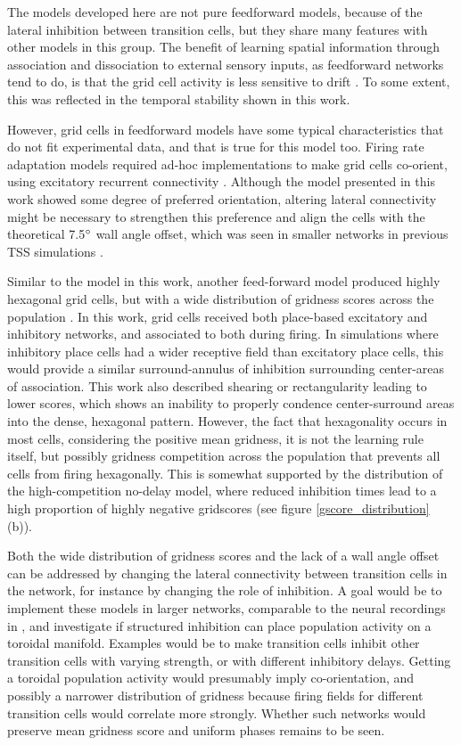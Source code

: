 \documentclass{article}
\begin{document}
    The models developed here are not pure feedforward models, because of the lateral inhibition between transition cells, but they share many features with other models in this group. The benefit of learning spatial information through association and dissociation to external sensory inputs, as feedforward networks tend to do, is that the grid cell activity is less sensitive to drift \parencite{Mulas2016}. To some extent, this was reflected in the temporal stability shown in this work.

    However, grid cells in feedforward models have some typical characteristics that do not fit experimental data, and that is true for this model too. Firing rate adaptation models required ad-hoc implementations to make grid cells co-orient, using excitatory recurrent connectivity \parencite{Barry2006,Si2013}. Although the model presented in this work showed some degree of preferred orientation, altering lateral connectivity might be necessary to strengthen this preference and align the cells with the theoretical 7.5\(\degree\) wall angle offset, which was seen in smaller networks in previous TSS simulations \parencite{Waniek2017}.

    Similar to the model in this work, another feed-forward model produced highly hexagonal grid cells, but with a wide distribution of gridness scores across the population \parencite{Weber2018}. In this work, grid cells received both place-based excitatory and inhibitory networks, and associated to both during firing. In simulations where inhibitory place cells had a wider receptive field than excitatory place cells, this would provide a similar surround-annulus of inhibition surrounding center-areas of association. This work also described shearing or rectangularity leading to lower scores, which shows an inability to properly condence center-surround areas into the dense, hexagonal pattern. However, the fact that hexagonality occurs in most cells, considering the positive mean gridness, it is not the learning rule itself, but possibly gridness competition across the population that prevents all cells from firing hexagonally. This is somewhat supported by the distribution of the high-competition no-delay model, where reduced inhibition times lead to a high proportion of highly negative gridscores (see figure \ref{gscore_distribution} (b)).

    Both the wide distribution of gridness scores and the lack of a wall angle offset can be addressed by changing the lateral connectivity between transition cells in the network, for instance by changing the role of inhibition. A goal would be to implement these models in larger networks, comparable to the neural recordings in \parencite{Gardner2022}, and investigate if structured inhibition can place population activity on a toroidal manifold. Examples would be to make transition cells inhibit other transition cells with varying strength, or with different inhibitory delays. Getting a toroidal population activity would presumably imply co-orientation, and possibly a narrower distribution of gridness because firing fields for different transition cells would correlate more strongly. Whether such networks would preserve mean gridness score and uniform phases remains to be seen.
    
\end{document}
